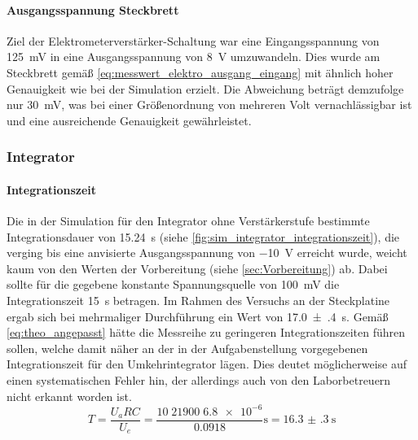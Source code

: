 \documentclass[12pt,english,ngerman]{scrartcl}
\begin{document}
\paragraph{Ausgangsspannung Steckbrett}
Ziel der Elektrometerverstärker-Schaltung war eine Eingangsspannung von
\SI{125}{\milli\volt} in eine Ausgangsspannung von \SI{8}{\volt} umzuwandeln.
Dies wurde am Steckbrett gemäß \autoref{eq:messwert_elektro_ausgang_eingang}
mit ähnlich hoher Genauigkeit wie bei der Simulation erzielt. Die Abweichung
beträgt demzufolge nur \SI{30}{\milli\volt}, was bei einer Größenordnung von
mehreren Volt vernachlässigbar ist und eine ausreichende Genauigkeit
gewährleistet.

\subsubsection{Integrator}
\paragraph{Integrationszeit}
Die in der Simulation für den Integrator ohne Verstärkerstufe bestimmte
Integrationsdauer von \SI{15,24}{\second} (siehe
\autoref{fig:sim_integrator_integrationszeit}), die verging bis eine anvisierte
Ausgangsspannung von \SI{-10}{\volt} erreicht wurde, weicht kaum von den Werten
der Vorbereitung (siehe \autoref{sec:Vorbereitung}) ab. Dabei sollte für die
gegebene konstante Spannungsquelle von \SI{100}{\milli\volt} die
Integrationszeit \SI{15}{\second} betragen. Im Rahmen des Versuchs an der
Steckplatine ergab sich bei mehrmaliger Durchführung ein Wert von
\SI{17.0(4)}{\second}.
Gemäß \autoref{eq:theo_angepasst} hätte die Messreihe zu geringeren Integrationszeiten führen sollen,
welche damit näher an der in der Aufgabenstellung vorgegebenen Integrationszeit für den Umkehrintegrator lägen.
Dies deutet möglicherweise auf einen systematischen Fehler hin, der allerdings auch von den Laborbetreuern nicht
erkannt worden ist.
\begin{equation}
  T = \frac{U_{a}RC}{U_e} = \frac{\num{10}\; \num{21900} \; \num{6.8e-6}}{\num{0.0918}}\si{\second} = \SI{16.3(3)}{\second}
  \label{eq:theo_angepasst}
\end{equation}
\end{document}
